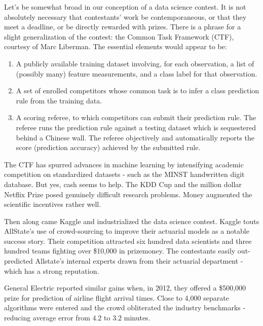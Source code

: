 Let's be somewhat broad in our conception of a data science contest. It is not absolutely necessary that contestants' work be contemporaneous, or that they meet a deadline, or be directly rewarded with prizes. There is a phrase for a slight generalization of the contest: the Common Task Framework (CTF), courtesy of Marc Liberman. The essential elements would appear to be:

\begin{enumerate}
\item A publicly available training dataset involving, for each observation, a list of (possibly many)
feature measurements, and a class label for that observation.
\item A set of enrolled competitors whose common task is to infer a class prediction rule from the
training data.
\item A scoring referee, to which competitors can submit their prediction rule. The referee runs the
prediction rule against a testing dataset which is sequestered behind a Chinese wall. The
referee objectively and automatically reports the score (prediction accuracy) achieved by the
submitted rule.
\end{enumerate}

The CTF has spurred advances in machine learning by intensifying academic competition on standardized datasets - such as the MINST handwritten digit database. But yes, cash seems to help. The KDD Cup and the million dollar Netflix Prize posed genuinely difficult research problems. Money augmented the scientific incentives rather well.  

Then along came Kaggle and industrialized the data science contest. Kaggle touts AllState's use of crowd-sourcing to improve their actuarial models as a notable success story. Their competition attracted six hundred data scientists and three hundred teams fighting over \$10,000 in prizemoney. The contestants easily out-predicted Allstate's internal experts drawn from their actuarial department - which has a strong reputation.

General Electric reported similar gains when, in 2012, they offered a \$500,000 prize for prediction of airline flight arrival times. Close to 4,000 separate algorithms were entered and the crowd obliterated the industry benchmarks - reducing average error from $4.2$ to $3.2$ minutes.   

